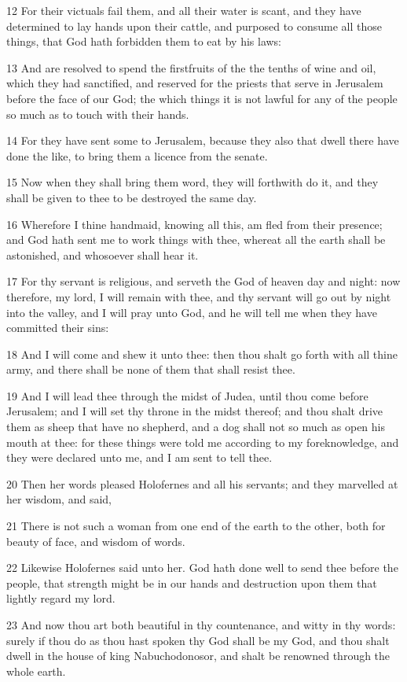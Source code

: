 \par 12 For their victuals fail them, and all their water is scant, and they have determined to lay hands upon their cattle, and purposed to consume all those things, that God hath forbidden them to eat by his laws:
\par 13 And are resolved to spend the firstfruits of the the tenths of wine and oil, which they had sanctified, and reserved for the priests that serve in Jerusalem before the face of our God; the which things it is not lawful for any of the people so much as to touch with their hands.
\par 14 For they have sent some to Jerusalem, because they also that dwell there have done the like, to bring them a licence from the senate.
\par 15 Now when they shall bring them word, they will forthwith do it, and they shall be given to thee to be destroyed the same day.
\par 16 Wherefore I thine handmaid, knowing all this, am fled from their presence; and God hath sent me to work things with thee, whereat all the earth shall be astonished, and whosoever shall hear it.
\par 17 For thy servant is religious, and serveth the God of heaven day and night: now therefore, my lord, I will remain with thee, and thy servant will go out by night into the valley, and I will pray unto God, and he will tell me when they have committed their sins:
\par 18 And I will come and shew it unto thee: then thou shalt go forth with all thine army, and there shall be none of them that shall resist thee.
\par 19 And I will lead thee through the midst of Judea, until thou come before Jerusalem; and I will set thy throne in the midst thereof; and thou shalt drive them as sheep that have no shepherd, and a dog shall not so much as open his mouth at thee: for these things were told me according to my foreknowledge, and they were declared unto me, and I am sent to tell thee.
\par 20 Then her words pleased Holofernes and all his servants; and they marvelled at her wisdom, and said,
\par 21 There is not such a woman from one end of the earth to the other, both for beauty of face, and wisdom of words.
\par 22 Likewise Holofernes said unto her. God hath done well to send thee before the people, that strength might be in our hands and destruction upon them that lightly regard my lord.
\par 23 And now thou art both beautiful in thy countenance, and witty in thy words: surely if thou do as thou hast spoken thy God shall be my God, and thou shalt dwell in the house of king Nabuchodonosor, and shalt be renowned through the whole earth.


